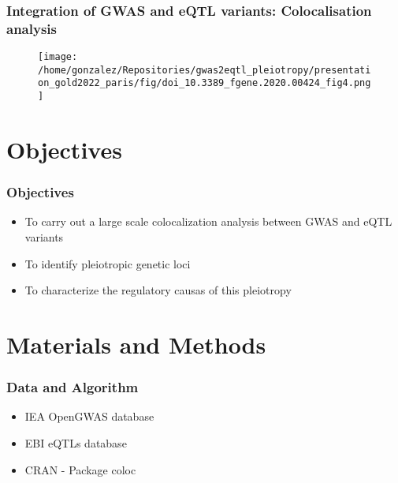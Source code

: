 \documentclass{beamer}
\begin{document}
\begin{frame}
\frametitle{Integration of GWAS and eQTL variants:  Colocalisation analysis}

\begin{figure}[!]
\texttt{[image: /home/gonzalez/Repositories/gwas2eqtl\_pleiotropy/presentation\_gold2022\_paris/fig/doi\_10.3389\_fgene.2020.00424\_fig4.png]}
\end{figure}

\let\thefootnote\relax{}
\end{frame}


\section{Objectives} %

\begin{frame}
\frametitle{Objectives}

\begin{itemize}
\item To carry out a large scale colocalization analysis between GWAS and eQTL variants
\item To identify pleiotropic genetic loci
\item To characterize the regulatory causas of this pleiotropy
\end{itemize}
\end{frame}

\section{Materials and Methods}

\begin{frame}
\frametitle{Data and Algorithm}

\begin{itemize}
\item IEA OpenGWAS database
\item EBI eQTLs database
\item CRAN - Package coloc
\end{itemize}

\let\thefootnote\relax{}
\end{frame}
\end{document}
